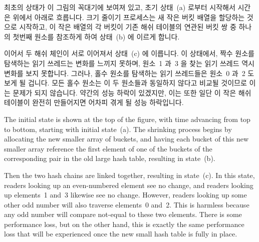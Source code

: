 최초의 상태가 이 그림의 꼭대기에 보여져 있고, 초기 상태~(a) 로부터 시작해서
시간은 위에서 아래로 흐릅니다.
크기 줄이기 프로세스는 새 작은 버킷 배열을 할당하는 것으로 시작하고, 이 작은
배열의 각 버킷이 기존 해쉬 테이블의 연관된 버킷 쌍 중 하나의 첫번째 원소를
참조하게 하여 상태~(b) 에 이르게 합니다.

이어서 두 해쉬 체인이 서로 이어져서 상태~(c) 에 이릅니다.
이 상태에서, 짝수 원소를 탐색하는 읽기 쓰레드는 변화를 느끼지 못하며, 원소~1
과~3 을 찾는 읽기 쓰레드 역시 변화를 보지 못합니다.
그러나, 홀수 원소를 탐색하는 읽기 쓰레드들은 원소~0 과~2 도 보게 될 겁니다.
모든 홀수 원소는 이 두 원소들과 동일하지 않다고 비교될 것이므로 이는 문제가
되지 않습니다.
약간의 성능 하락이 있겠지만, 이는 또한 일단 이 작은 해쉬 테이블이 완전히
만들어지면 어차피 겪게 될 성능 하락입니다.

\iffalse

The initial state is shown at the top of the figure, with time advancing
from top to bottom, starting with initial state~(a).
The shrinking process begins by allocating the new smaller array of
buckets, and having each bucket of this new smaller array reference
the first element of one of the buckets of the corresponding pair in
the old large hash table, resulting in state~(b).

Then the two hash chains are linked together, resulting in state~(c).
In this state, readers looking up an even-numbered element see no change,
and readers looking up elements~1 and~3 likewise see no change.
However, readers looking up some other odd number will also traverse
elements~0 and~2.
This is harmless because any odd number will compare not-equal to these
two elements.
There is some performance loss, but on the other hand, this is exactly
the same performance loss that will be experienced once the new small
hash table is fully in place.

